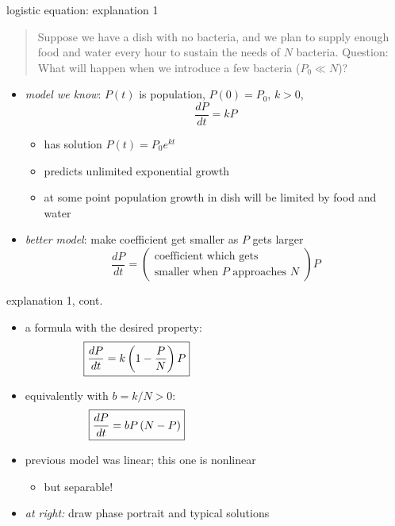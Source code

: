 \documentclass[colorlinks]{beamer}
\begin{document}
\begin{frame}{logistic equation: explanation 1}

\small
\begin{quotation}
\noindent Suppose we have a dish with no bacteria, and we plan to supply enough food and water every hour to sustain the needs of $N$ bacteria.  Question: What will happen when we introduce a few bacteria ($P_0 \ll N$)?
\end{quotation}

\normalsize
\begin{itemize}
\item \emph{model we know}:  $P(t)$ is population, $P(0)=P_0$, $k>0$,
    $$\frac{dP}{dt} = k P$$

\vspace{-2mm}
    \begin{itemize}
    \item has solution $P(t) = P_0 e^{kt}$
    \item predicts unlimited exponential growth
    \item at some point population growth in dish will be limited by food and water
    \end{itemize}
\item \emph{better model}: make coefficient get smaller as $P$ gets larger
    $$\frac{dP}{dt} = \left(\begin{matrix} \text{coefficient which gets} \\ \text{smaller when $P$ approaches $N$}\end{matrix} \right) P$$
\end{itemize}
\end{frame}


\begin{frame}{explanation 1, cont.}

\begin{itemize}
\item a formula with the desired property:
    $$\boxed{\frac{dP}{dt} = k \left(1-\frac{P}{N}\right) P} \hspace{50mm}$$
\item equivalently with $b=k/N >0$:
    $$\boxed{\frac{dP}{dt} = b P \left(N-P\right)} \hspace{50mm}$$
\item previous model was linear; this one is nonlinear
     \begin{itemize}
     \item but separable!
     \end{itemize}
\item \emph{at right:} draw phase portrait and typical solutions
\end{itemize}
\end{frame}
\end{document}
